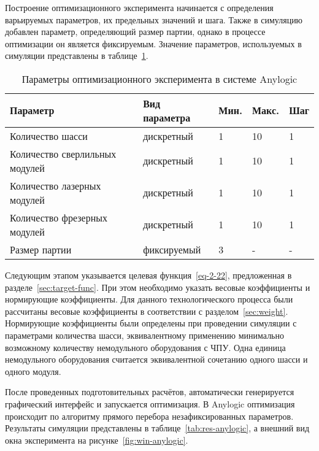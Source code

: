 Построение оптимизационного эксперимента начинается с определения варьируемых параметров, их предельных значений и шага.  Также в симуляцию добавлен параметр, определяющий размер партии, однако в процессе оптимизации он является фиксируемым. Значение параметров, используемых в симуляции представлены в таблице~\cref{tab:par-anylogic}.

\begin{table} [!htb]
	\centering
	\caption{Параметры оптимизационного эксперимента в системе Anylogic} \vspace{4pt}
	\label{tab:par-anylogic}
	\begin{threeparttable}
		\begin{tabularx}{\linewidth}{lllll}
			\toprule
			Параметр & Вид параметра & Мин. & Макс. & Шаг \\
			\midrule
			Количество шасси               & дискретный  & 1 & 10 & 1 \\
			Количество сверлильных модулей & дискретный  & 1 & 10 & 1 \\
			Количество лазерных модулей    & дискретный  & 1 & 10 & 1 \\
			Количество фрезерных модулей   & дискретный  & 1 & 10 & 1 \\
			Размер партии                  & фиксируемый & 3 &  - & - \\
			\bottomrule
		\end{tabularx}
	\end{threeparttable}
\end{table}

Следующим этапом указывается целевая функция~\cref{eq-2-22}, предложенная в разделе~\cref{sec:target-func}. При этом необходимо указать весовые коэффициенты и нормирующие коэффициенты. Для данного технологического процесса были рассчитаны весовые коэффициенты в соответствии с разделом~\cref{sec:weight}. 
Нормирующие коэффициенты были определены при проведении симуляции с параметрами количества шасси, эквивалентному применению минимально возможному количеству немодульного оборудования с ЧПУ. Одна единица немодульного оборудования считается эквивалентной сочетанию одного шасси и одного модуля.

После проведенных подготовительных расчётов, автоматически генерируется графический интерфейс и запускается оптимизация. В Anylogic оптимизация происходит по алгоритму прямого перебора незафиксированных параметров. Результаты симуляции представлены в таблице~\cref{tab:res-anylogic}, а внешний вид окна эксперимента на рисунке~\cref{fig:win-anylogic}.

